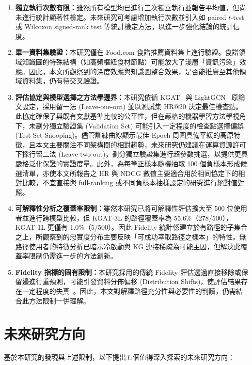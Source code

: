 \begin{enumerate}[leftmargin=2em]
  \item \textbf{獨立執行次數有限：}雖然所有模型均已進行三次獨立執行並報告平均值，但尚未進行統計顯著性檢定。未來研究可考慮增加執行次數並引入如 paired $t$-test 或 Wilcoxon signed-rank test 等統計檢定方法，以進一步強化結論的統計信度。
  \item \textbf{單一資料集驗證：}本研究僅在 Food.com 食譜推薦資料集上進行驗證。食譜領域知識圖的特殊結構（如高頻樞紐食材節點）可能放大了淺層「資訊污染」效應。因此，本文所觀察到的深度效應與知識圖整合效果，是否能推廣至其他領域資料集，仍有待交叉驗證。
  \item \textbf{評估協定與模型選擇之方法學邊界：}本研究依循 KGAT~\cite{wang2019kgat} 與 LightGCN~\cite{he2020lightgcn} 原論文設定，採用留一法 (Leave-one-out) 並以測試集 HR@20 決定最佳檢查點。此協定確保了與既有文獻基準比較的公平性，但在嚴格的機器學習方法學視角下，未劃分獨立驗證集 (Validation Set) 可能引入一定程度的檢查點選擇偏誤 (Test-Set Snooping)。儘管訓練曲線顯示最佳 Epoch 周圍具備平緩的高原特徵，且本文主要關注不同架構間的相對趨勢，未來研究仍建議在運算資源許可下採行留二法 (Leave-two-out)，劃分獨立驗證集進行超參數挑選，以提供更具嚴格泛化保證的實證度量。此外，為每筆正樣本隨機抽取 100 個負樣本形成候選清單，亦使本文所報告之 HR 與 NDCG 數值主要適合用於相同協定下的相對比較，不宜直接與 full-ranking 或不同負樣本抽樣設定的研究進行絕對值對照。
  \item \textbf{可解釋性分析之覆蓋率限制：}雖然本研究已將可解釋性評估擴大至 500 位使用者並進行跨模型比較，但 KGAT-3L 的路徑覆蓋率為 55.6\%（278/500），KGAT-1L 更僅有 1.0\%（5/500）。因此 Fidelity 統計係建立於有路徑的子集合之上，所觀察到的忠實度分布主要反映「可成功萃取路徑之樣本」的特性。無路徑使用者的特徵分析已暗示冷啟動與 KG 連接稀疏為可能主因，但解決此覆蓋率限制仍需進一步的方法創新。
  \item \textbf{Fidelity 指標的固有限制：}本研究採用的傳統 Fidelity 評估透過直接移除或保留邊進行重預測，可能引發資料分佈偏移 (Distribution Shifts)，使評估結果存在一定程度的失真~\cite{agarwal2024fidelity}。因此，本文對解釋路徑充分性與必要性的判讀，仍需結合此方法限制一併理解。
\end{enumerate}

\section{未來研究方向}

基於本研究的發現與上述限制，以下提出五個值得深入探索的未來研究方向：

